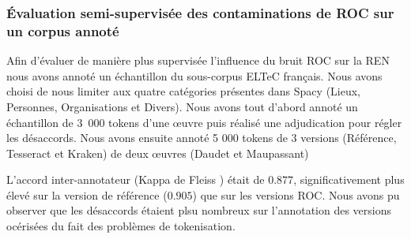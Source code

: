 %    
%



\subsubsection{\'Evaluation semi-supervisée des contaminations de ROC sur un corpus annoté}

Afin d'évaluer de manière plus supervisée l'influence du bruit ROC sur la REN nous avons annoté un échantillon du sous-corpus ELTeC français.
 Nous avons choisi de nous limiter aux quatre catégories présentes dans Spacy (Lieux, Personnes, Organisations et Divers).
  Nous avons tout d'abord annoté un échantillon de 3~000 tokens d'une œuvre  puis réalisé une adjudication pour régler les désaccords. 
  Nous avons ensuite annoté 5 000 tokens de 3 versions (Référence, Tesseract et Kraken) de deux œuvres (Daudet et Maupassant)

L'accord inter-annotateur (Kappa de  Fleiss \cite{fleiss2013statistical}) était de $0.877$, significativement plus élevé sur la version de référence ($0.905$) que sur les versions ROC. Nous avons pu observer que les désaccords étaient plsu nombreux sur l'annotation des versions océrisées du fait des problèmes de tokenisation.


